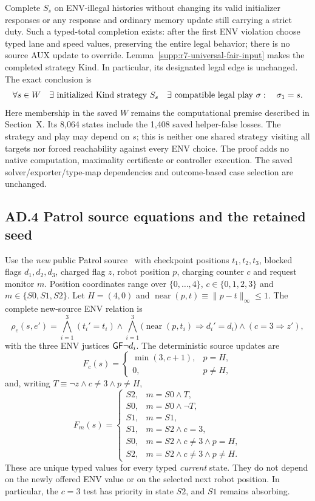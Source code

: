 Complete $S_s$ on ENV-illegal histories without changing its valid
initializer responses or any response and ordinary memory update still
carrying a strict duty. Such a typed-total completion exists: after the first
ENV violation choose typed lane and speed values, preserving the entire
legal behavior; there is no source AUX update to override.
Lemma~\ref{supp:r7-universal-fair-input} makes the completed strategy Kind.
In particular, its designated legal edge is unchanged. The exact conclusion is
\[
 \forall s\in W\quad
 \exists\hbox{ initialized Kind strategy }S_s\quad
 \exists\hbox{ compatible legal play }\sigma:
 \quad \sigma_1=s .
\]
Here membership in the saved $W$ remains the computational premise described
in Section~X. Its 8,064 states include the 1,408 saved helper-false losses.
The strategy and play may depend on $s$; this is neither one shared strategy
visiting all targets nor forced reachability against every ENV choice.
The proof adds no native computation, maximality certificate or controller
execution. The saved solver/exporter/type-map dependencies and
outcome-based case selection are unchanged.

\subsection*{AD.4 Patrol source equations and the retained seed}
\label{supp:r7-patrol-kind-source}
Use the \emph{new} public Patrol source~\cite{kindartifact} with checkpoint
positions $t_1,t_2,t_3$, blocked flags $d_1,d_2,d_3$, charged flag $z$,
robot position $p$, charging counter $c$ and request monitor $m$.
Position coordinates range over $\{0,\ldots,4\}$,
$c\in\{0,1,2,3\}$ and $m\in\{S0,S1,S2\}$.
Let $H=(4,0)$ and
$\operatorname{near}(p,t)\equiv\|p-t\|_\infty\le1$.
The complete new-source ENV relation is
\[
 \rho_e(s,e')=
 \bigwedge_{i=1}^3(t_i'=t_i)
 \land
 \bigwedge_{i=1}^3
   \bigl(\operatorname{near}(p,t_i)\Rightarrow d_i'=d_i\bigr)
 \land(c=3\Rightarrow z'),
\]
with the three ENV justices $\mathsf{G}\mathsf{F}\neg d_i$.
The deterministic source updates are
\[
 F_c(s)=
 \begin{cases}
  \min(3,c+1),&p=H,\\
  0,&p\ne H,
 \end{cases}
\]
and, writing $T\equiv\neg z\land c\ne3\land p\ne H$,
\[
 F_m(s)=
 \begin{cases}
  S2,&m=S0\land T,\\
  S0,&m=S0\land\neg T,\\
  S1,&m=S1,\\
  S1,&m=S2\land c=3,\\
  S0,&m=S2\land c\ne3\land p=H,\\
  S2,&m=S2\land c\ne3\land p\ne H .
 \end{cases}
\]
These are unique typed values for every typed \emph{current} state.
They do not depend on the newly offered ENV value or on the selected next
robot position. In particular, the $c=3$ test has priority in state $S2$,
and $S1$ remains absorbing.

